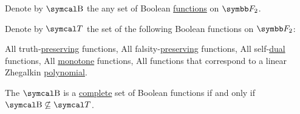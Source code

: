 \begin{theorem}\label{thm:posts_completeness_theorem}
  Denote by \( \CB \) the any set of Boolean \hyperref[def:boolean_function]{functions} on \( \BF_2 \).

  Denote by \( \Cal{T} \) the set of the following Boolean functions on \( \BF_2 \):
  \begin{PropEnum}
     All truth-\hyperref[def:boolean_functions_in_f2/truth_preserving]{preserving} functions,
     All falsity-\hyperref[def:boolean_functions_in_f2/falsity_preserving]{preserving} functions,
     All self-\hyperref[def:boolean_functions_in_f2/self_dual]{dual} functions,
     All \hyperref[def:boolean_functions_in_f2/self_dual]{monotone} functions,
     All functions that correspond to a linear Zhegalkin \hyperref[def:zhegalkin_polynomial]{polynomial}.
  \end{PropEnum}

  The \( \CB \) is a \hyperref[def:boolean_closure]{complete} set of Boolean functions if and only if \( \CB \not\subseteq \Cal{T} \).
\end{theorem}

